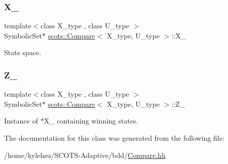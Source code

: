 \subsubsection{\texorpdfstring{X\+\_\+}{X\_}}
{\footnotesize\ttfamily template$<$class X\+\_\+type , class U\+\_\+type $>$ \\
Symbolic\+Set$\ast$ \hyperlink{classscots_1_1Compare}{scots\+::\+Compare}$<$ X\+\_\+type, U\+\_\+type $>$\+::X\+\_\+}

State space. \mbox{\label{classscots_1_1Compare_ae1a8d5e076e059cda7124581dc3d05ab}} 
\subsubsection{\texorpdfstring{Z\+\_\+}{Z\_}}
{\footnotesize\ttfamily template$<$class X\+\_\+type , class U\+\_\+type $>$ \\
Symbolic\+Set$\ast$ \hyperlink{classscots_1_1Compare}{scots\+::\+Compare}$<$ X\+\_\+type, U\+\_\+type $>$\+::Z\+\_\+}

Instance of $\ast$\+X\+\_\+ containing winning states. 

The documentation for this class was generated from the following file\+:\begin{DoxyCompactItemize}
\item 
/home/kylehsu/\+S\+C\+O\+T\+S-\/\+Adaptive/bdd/\hyperlink{Compare_8hh}{Compare.\+hh}\end{DoxyCompactItemize}
